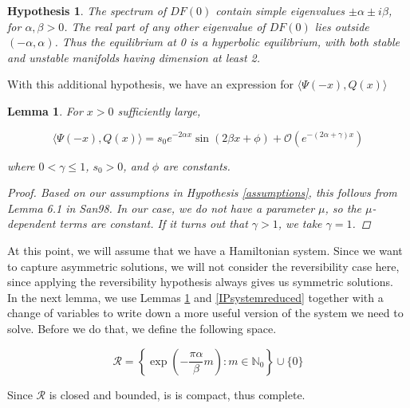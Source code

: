 \documentclass[12pt]{article}
\def\N{{\mathbb N}}
\newtheorem{lemma}{Lemma}
\newtheorem{hypothesis}{Hypothesis}
\begin{document}
\begin{hypothesis}The spectrum of $DF(0)$ contain simple eigenvalues $\pm \alpha \pm i \beta$, for $\alpha, \beta > 0$. The real part of any other eigenvalue of $DF(0)$ lies outside $(-\alpha, \alpha)$. Thus the equilibrium at 0 is a hyperbolic equilibrium, with both stable and unstable manifolds having dimension at least 2.
\end{hypothesis}

With this additional hypothesis, we have an expression for $\langle \Psi(-x), Q(x) \rangle$


\begin{lemma}\label{IPform}
For $x > 0$ sufficiently large,

\begin{equation}\label{IPalphabeta}
\langle \Psi(-x), Q(x) \rangle
= s_0 e^{-2 \alpha x} \sin(2 \beta x + \phi) + \mathcal{O}(e^{-(2 \alpha + \gamma) x})
\end{equation}

where $0 < \gamma \leq 1$, $s_0 > 0$, and $\phi$ are constants.
\begin{proof}
Based on our assumptions in Hypothesis \ref{assumptions}, this follows from Lemma 6.1 in San98. In our case, we do not have a parameter $\mu$, so the $\mu$-dependent terms are constant. If it turns out that $\gamma > 1$, we take $\gamma = 1$.
\end{proof}
\end{lemma}

At this point, we will assume that we have a Hamiltonian system. Since we want to capture asymmetric solutions, we will not consider the reversibility case here, since applying the reversibility hypothesis always gives us symmetric solutions.\\

In the next lemma, we use Lemmas \ref{IPform} and \ref{IPsystemreduced} together with a change of variables to write down a more useful version of the system we need to solve. Before we do that, we define the following space.

\begin{equation}\label{setR}
\mathcal{R} = \left\{ \exp\left(-\frac{\pi \alpha}{\beta}m\right) : m \in \N_0 \right\} \cup \{ 0 \}
\end{equation}

Since $\mathcal{R}$ is closed and bounded, is is compact, thus complete.

\end{document}
